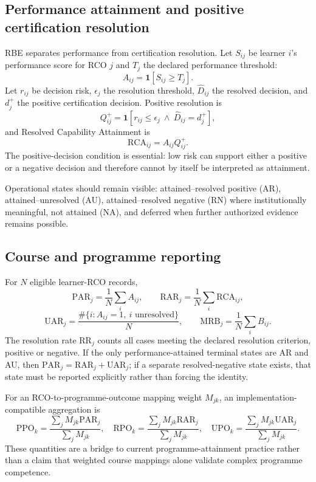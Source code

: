 \subsection{Performance attainment and positive certification resolution}
RBE separates performance from certification resolution. Let $S_{ij}$ be learner $i$'s performance score for RCO $j$ and $T_j$ the declared performance threshold:
\[
A_{ij}=\mathbf{1}[S_{ij}\ge T_j].
\]
Let $r_{ij}$ be decision risk, $\epsilon_j$ the resolution threshold, $\widehat D_{ij}$ the resolved decision, and $d_j^+$ the positive certification decision. Positive resolution is
\[
Q^+_{ij}=\mathbf{1}[r_{ij}\le\epsilon_j\ \land\ \widehat D_{ij}=d_j^+],
\]
and Resolved Capability Attainment is
\[
\mathrm{RCA}_{ij}=A_{ij}Q^+_{ij}.
\]
The positive-decision condition is essential: low risk can support either a positive or a negative decision and therefore cannot by itself be interpreted as attainment.

Operational states should remain visible: attained--resolved positive (AR), attained--unresolved (AU), attained--resolved negative (RN) where institutionally meaningful, not attained (NA), and deferred when further authorized evidence remains possible.

\subsection{Course and programme reporting}
For $N$ eligible learner-RCO records,
\[
\mathrm{PAR}_j=\frac{1}{N}\sum_i A_{ij},\qquad
\mathrm{RAR}_j=\frac{1}{N}\sum_i\mathrm{RCA}_{ij},
\]
\[
\mathrm{UAR}_j=\frac{\#\{i:A_{ij}=1,\ i\text{ unresolved}\}}{N},\qquad
\mathrm{MRB}_j=\frac{1}{N}\sum_i B_{ij}.
\]
The resolution rate $\mathrm{RR}_j$ counts all cases meeting the declared resolution criterion, positive or negative. If the only performance-attained terminal states are AR and AU, then $\mathrm{PAR}_j=\mathrm{RAR}_j+\mathrm{UAR}_j$; if a separate resolved-negative state exists, that state must be reported explicitly rather than forcing the identity.

For an RCO-to-programme-outcome mapping weight $M_{jk}$, an implementation-compatible aggregation is
\[
\mathrm{PPO}_k=\frac{\sum_jM_{jk}\mathrm{PAR}_j}{\sum_jM_{jk}},\quad
\mathrm{RPO}_k=\frac{\sum_jM_{jk}\mathrm{RAR}_j}{\sum_jM_{jk}},\quad
\mathrm{UPO}_k=\frac{\sum_jM_{jk}\mathrm{UAR}_j}{\sum_jM_{jk}}.
\]
These quantities are a bridge to current programme-attainment practice rather than a claim that weighted course mappings alone validate complex programme competence.

